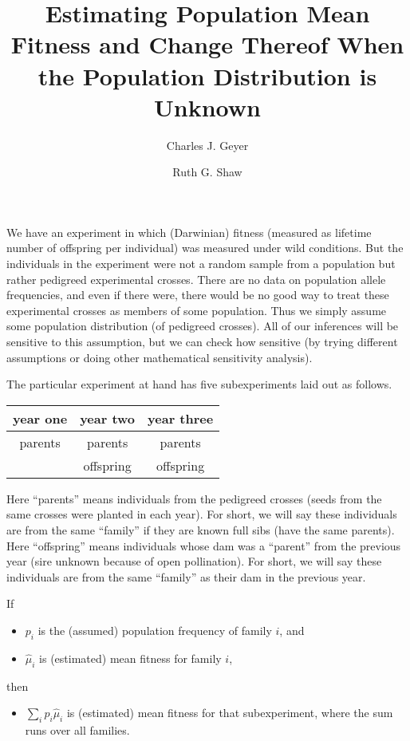 \documentclass[11pt]{article}
\begin{document}
\title{Estimating Population Mean Fitness and Change Thereof When
    the Population Distribution is Unknown}

\author{Charles J. Geyer \and Ruth G. Shaw}

\maketitle

We have an experiment in which (Darwinian) fitness (measured as lifetime
number of offspring per individual) was measured under wild conditions.
But the individuals in the experiment were not a random sample from
a population but rather pedigreed experimental crosses.  There are no data on
population allele frequencies, and even if there were, there would be
no good way to treat these experimental crosses as members of some
population.  Thus we simply assume some population distribution (of
pedigreed crosses).  All of our inferences will be sensitive to this
assumption, but we can check how sensitive (by trying different assumptions
or doing other mathematical sensitivity analysis).

The particular experiment at hand has five subexperiments laid out as follows.
\begin{center}
\begin{tabular}{ccc}
year one & year two & year three \\
\hline
parents & parents & parents \\
        & offspring & offspring
\end{tabular}
\end{center}
Here ``parents'' means individuals from the pedigreed crosses (seeds from
the same crosses were planted in each year).  For short, we will say these
individuals are from the same ``family'' if they are known full sibs
(have the same parents).
Here ``offspring'' means individuals whose dam was a ``parent'' from the
previous year (sire unknown because of open pollination).
For short, we will say these
individuals are from the same ``family'' as their dam in the previous year.

\pagebreak[3]

If
\begin{itemize}
\item $p_i$ is the (assumed) population frequency of family $i$, and
\item $\hat{\mu}_i$ is (estimated) mean fitness for family $i$,
\end{itemize}
then
\begin{itemize}
\item $\sum_i p_i \hat{\mu}_i$ is (estimated) mean fitness for
that subexperiment, where the sum runs over all families.
\end{itemize}
\end{document}
